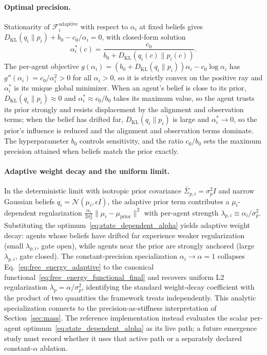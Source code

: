 \documentclass[11pt]{article}
\begin{document}
\paragraph{Optimal precision.}
Stationarity of $\mathcal{F}_i^{\mathrm{adaptive}}$ with respect to $\alpha_i$ at fixed beliefs gives $D_{\mathrm{KL}}(q_i\|p_i) + b_0 - c_0/\alpha_i = 0$, with closed-form solution
\begin{equation}
\boxed{
\alpha_i^*(c) = \frac{c_0}{b_0 + D_{\mathrm{KL}}(q_i(c)\|p_i(c))}.
}
\label{eq:state_dependent_alpha}
\end{equation}
The per-agent objective $g(\alpha_i) = (b_0 + D_{\mathrm{KL}}(q_i\|p_i))\alpha_i - c_0\log\alpha_i$ has $g''(\alpha_i) = c_0/\alpha_i^2 > 0$ for all $\alpha_i > 0$, so it is strictly convex on the positive ray and $\alpha_i^*$ is its unique global minimizer. When an agent's belief is close to its prior, $D_{\mathrm{KL}}(q_i\|p_i) \approx 0$ and $\alpha_i^* \approx c_0/b_0$ takes its maximum value, so the agent trusts its prior strongly and resists displacement by the alignment and observation terms; when the belief has drifted far, $D_{\mathrm{KL}}(q_i\|p_i)$ is large and $\alpha_i^* \to 0$, so the prior's influence is reduced and the alignment and observation terms dominate. The hyperparameter $b_0$ controls sensitivity, and the ratio $c_0/b_0$ sets the maximum precision attained when beliefs match the prior exactly.

\paragraph{Adaptive weight decay and the uniform limit.}
In the deterministic limit with isotropic prior covariance $\bar\Sigma_{p,i} = \sigma_p^2 I$ and narrow Gaussian beliefs $q_i = \mathcal{N}(\mu_i, \epsilon I)$, the adaptive prior term contributes a $\mu_i$-dependent regularization $\frac{\alpha_i}{2\sigma_p^2}\|\mu_i - \mu_{\mathrm{prior}}\|^2$ with per-agent strength $\lambda_{p,i} \equiv \alpha_i/\sigma_p^2$. Substituting the optimum~\eqref{eq:state_dependent_alpha} yields adaptive weight decay: agents whose beliefs have drifted far experience weaker regularization (small $\lambda_{p,i}$, gate open), while agents near the prior are strongly anchored (large $\lambda_{p,i}$, gate closed). The constant-precision specialization $\alpha_i \to \alpha = 1$ collapses Eq.~\eqref{eq:free_energy_adaptive} to the canonical functional~\eqref{eq:free_energy_functional_final} and recovers uniform L2 regularization $\lambda_p = \alpha/\sigma_p^2$, identifying the standard weight-decay coefficient with the product of two quantities the framework treats independently. This analytic specialization connects to the precision-as-stiffness interpretation of Section~\ref{sec:mass}. The reference implementation instead evaluates the scalar per-agent optimum~\eqref{eq:state_dependent_alpha} as its live path; a future emergence study must record whether it uses that active path or a separately declared constant-$\alpha$ ablation.
\end{document}

